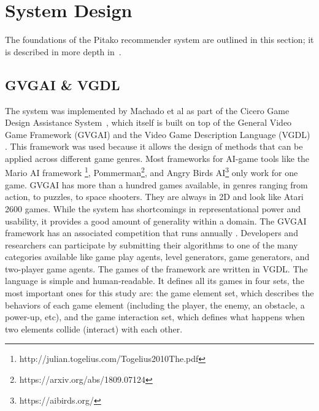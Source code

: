\documentclass[letterpaper]{article} %
\begin{document}
\section{System Design}
The foundations of the Pitako recommender system are outlined in this section; it is described in more depth in~\cite{machado2019pitako}.
\subsection{GVGAI \& VGDL}
The system was implemented by Machado et al as part of the Cicero Game Design Assistance System~\cite{Machado2018AIAssistedGD}, which itself is built on top of the General Video Game Framework (GVGAI) \cite{perez20162014} and the Video Game Description Language (VGDL) \cite{schaul2013video,ebner2013towards}.
This framework was used because it allows the design of methods that can be applied across different game genres. Most frameworks for AI-game tools like the Mario AI framework \footnote{http://julian.togelius.com/Togelius2010The.pdf}, Pommerman\footnote{https://arxiv.org/abs/1809.07124}, and Angry Birds AI\footnote{https://aibirds.org/} only work for one game. GVGAI has more than a hundred games available, in genres ranging from action, to puzzles, to space shooters. They are always in 2D and look like Atari 2600 games. While the system has shortcomings in representational power and usability, it provides a good amount of generality within a domain.
The GVGAI framework has an associated competition that runs annually \cite{perez20162014}. Developers and researchers can participate by submitting their algorithms to one of the many categories available like game play agents, level generators, game generators, and two-player game agents.
The games of the framework are written in VGDL. The language is simple and human-readable. It defines all its games in four sets, the most important ones for this study are:
the game element set, which describes the behaviors of each game element (including the player, the enemy, an obstacle, a power-up, etc),
and the game interaction set, which defines what happens when two elements collide (interact) with each other.
\end{document}
